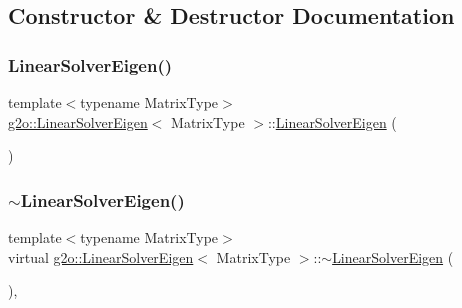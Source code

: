\subsection{Constructor \& Destructor Documentation}
\mbox{\label{classg2o_1_1_linear_solver_eigen_ac9e7b64d4a559e6972a8b3798f490bd8}} 
\subsubsection{\texorpdfstring{Linear\+Solver\+Eigen()}{LinearSolverEigen()}}
{\footnotesize\ttfamily template$<$typename Matrix\+Type$>$ \\
\mbox{\hyperlink{classg2o_1_1_linear_solver_eigen}{g2o\+::\+Linear\+Solver\+Eigen}}$<$ Matrix\+Type $>$\+::\mbox{\hyperlink{classg2o_1_1_linear_solver_eigen}{Linear\+Solver\+Eigen}} (\begin{DoxyParamCaption}{ }\end{DoxyParamCaption})\hspace{0.3cm}{\ttfamily [inline]}}

\mbox{\label{classg2o_1_1_linear_solver_eigen_afd2eeb1d54a420e110b9b8cdf74b1cff}} 
\subsubsection{\texorpdfstring{$\sim$\+Linear\+Solver\+Eigen()}{~LinearSolverEigen()}}
{\footnotesize\ttfamily template$<$typename Matrix\+Type$>$ \\
virtual \mbox{\hyperlink{classg2o_1_1_linear_solver_eigen}{g2o\+::\+Linear\+Solver\+Eigen}}$<$ Matrix\+Type $>$\+::$\sim$\mbox{\hyperlink{classg2o_1_1_linear_solver_eigen}{Linear\+Solver\+Eigen}} (\begin{DoxyParamCaption}{ }\end{DoxyParamCaption})\hspace{0.3cm}{\ttfamily [inline]}, {\ttfamily [virtual]}}



